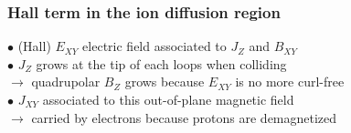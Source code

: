\documentclass{beamer}
\newcommand{\D}{{\mathrm d}}
\begin{document}



\begin{frame}
\frametitle{Hall term in the ion diffusion region}

\begin{center}

\end{center}

$\bullet$ (Hall) $E_{XY}$ electric field associated to $J_Z$ and $B_{XY}$ \\[0.3cm]
$\bullet$ $J_Z$ grows at the tip of each loops when colliding\\
$\to$ quadrupolar $B_Z$ grows because $E_{XY}$ is no more curl-free\\[0.3cm]
$\bullet$ $J_{XY}$ associated to this out-of-plane magnetic field\\
$\to$ carried by electrons because protons are demagnetized

\end{frame}
\end{document}
